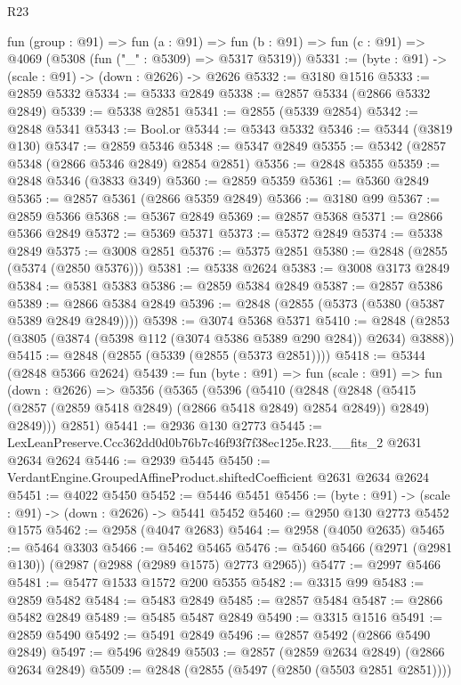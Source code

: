 \begin{lexlean}{R23}
\begin{coremodule}
  fun (group : @91) =>
  fun (a : @91) =>
  fun (b : @91) => fun (c : @91) => @4069 (@5308 (fun ("_" : @5309) => @5317 @5319))
@5331 := (byte : @91) -> (scale : @91) -> (down : @2626) -> @2626
@5332 := @3180 @1516
@5333 := @2859 @5332
@5334 := @5333 @2849
@5338 := @2857 @5334 (@2866 @5332 @2849)
@5339 := @5338 @2851
@5341 := @2855 (@5339 @2854)
@5342 := @2848 @5341
@5343 := Bool.or
@5344 := @5343 @5332
@5346 := @5344 (@3819 @130)
@5347 := @2859 @5346
@5348 := @5347 @2849
@5355 := @5342 (@2857 @5348 (@2866 @5346 @2849) @2854 @2851)
@5356 := @2848 @5355
@5359 := @2848 @5346 (@3833 @349)
@5360 := @2859 @5359
@5361 := @5360 @2849
@5365 := @2857 @5361 (@2866 @5359 @2849)
@5366 := @3180 @99
@5367 := @2859 @5366
@5368 := @5367 @2849
@5369 := @2857 @5368
@5371 := @2866 @5366 @2849
@5372 := @5369 @5371
@5373 := @5372 @2849
@5374 := @5338 @2849
@5375 := @3008 @2851
@5376 := @5375 @2851
@5380 := @2848 (@2855 (@5374 (@2850 @5376)))
@5381 := @5338 @2624
@5383 := @3008 @3173 @2849
@5384 := @5381 @5383
@5386 := @2859 @5384 @2849
@5387 := @2857 @5386
@5389 := @2866 @5384 @2849
@5396 := @2848 (@2855 (@5373 (@5380 (@5387 @5389 @2849 @2849))))
@5398 := @3074 @5368 @5371
@5410 := @2848 (@2853 (@3805 (@3874 (@5398 @112 (@3074 @5386 @5389 @290 @284)) @2634) @3888))
@5415 := @2848 (@2855 (@5339 (@2855 (@5373 @2851))))
@5418 := @5344 (@2848 @5366 @2624)
@5439 := fun (byte : @91) =>
  fun (scale : @91) =>
  fun (down : @2626) =>
  @5356
    (@5365
      (@5396
        (@5410
          (@2848
            (@2848 (@5415 (@2857 (@2859 @5418 @2849) (@2866 @5418 @2849) @2854 @2849)) @2849)
            @2849)))
      @2851)
@5441 := @2936 @130 @2773
@5445 := LexLeanPreserve.Ccc362dd0d0b76b7c46f93f7f38ec125e.R23.__fits_2 @2631 @2634 @2624
@5446 := @2939 @5445
@5450 := VerdantEngine.GroupedAffineProduct.shiftedCoefficient @2631 @2634 @2624
@5451 := @4022 @5450
@5452 := @5446 @5451
@5456 := (byte : @91) -> (scale : @91) -> (down : @2626) -> @5441 @5452
@5460 := @2950 @130 @2773 @5452 @1575
@5462 := @2958 (@4047 @2683)
@5464 := @2958 (@4050 @2635)
@5465 := @5464 @3303
@5466 := @5462 @5465
@5476 := @5460 @5466 (@2971 (@2981 @130)) (@2987 (@2988 (@2989 @1575) @2773 @2965))
@5477 := @2997 @5466
@5481 := @5477 @1533 @1572 @200 @5355
@5482 := @3315 @99
@5483 := @2859 @5482
@5484 := @5483 @2849
@5485 := @2857 @5484
@5487 := @2866 @5482 @2849
@5489 := @5485 @5487 @2849
@5490 := @3315 @1516
@5491 := @2859 @5490
@5492 := @5491 @2849
@5496 := @2857 @5492 (@2866 @5490 @2849)
@5497 := @5496 @2849
@5503 := @2857 (@2859 @2634 @2849) (@2866 @2634 @2849)
@5509 := @2848 (@2855 (@5497 (@2850 (@5503 @2851 @2851))))

\end{coremodule}
\end{lexlean}
